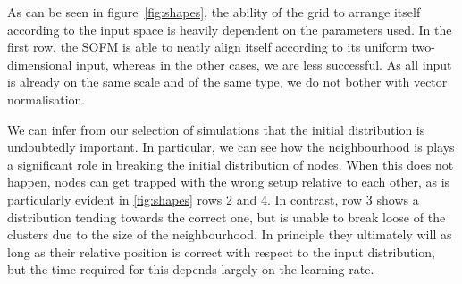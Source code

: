 \documentclass[10pt, twocolumn]{article}\usepackage[]{graphicx}\usepackage[]{color}
\theoremstyle{plain}
\newcommand{\kh}{SOFM\xspace}
\begin{document}
    As can be seen in figure~\cref{fig:shapes}, the ability of the grid to arrange itself according to the input space is heavily dependent on the parameters used. In the first row, the \kh is able to neatly align itself according to its uniform two-dimensional input, whereas in the other cases, we are less successful. As all input is already on the same scale and of the same type, we do not bother with vector normalisation.
    
    We can infer from our selection of simulations that the initial distribution is undoubtedly important. In particular, we can see how the neighbourhood is plays a significant role in breaking the initial distribution of nodes. When this does not happen, nodes can get trapped with the wrong setup relative to each other, as is particularly evident in \cref{fig:shapes} rows 2 and 4. In contrast, row 3 shows a distribution tending towards the correct one, but is unable to break loose of the clusters due to the size of the neighbourhood. In principle they ultimately will as long as their relative position is correct with respect to the input distribution, but the time required for this depends largely on the learning rate.
    
\end{document}
